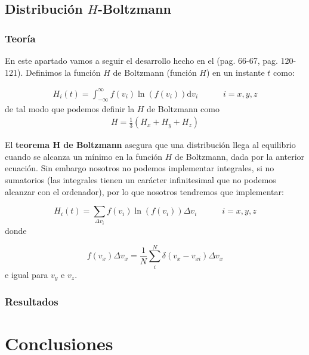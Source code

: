 \documentclass[11pt]{article} %
\newcommand{\parentesis}[1]{\left( #1  \right)}
\newcommand{\D}{\mathrm{d}}
\newcommand{\tquad}{\quad \quad \quad}
\begin{document}
	
\subsection{Distribución $H$-Boltzmann} 	
\subsubsection{Teoría}

En este apartado vamos a seguir el desarrollo hecho en el \cite{Haile} (pag. 66-67, pag. 120-121). Definimos la función $H$ de Boltzmann (función $H$) en un instante $t$ como:

\begin{eqnarray}
	H_i(t) = \int_{-\infty}^{\infty} f(v_i) \ln (f(v_i)) \D v_i \tquad i = x,y,z
\end{eqnarray} 
de tal modo que podemos definir la $H$ de Boltzmann como
\begin{eqnarray}
	H=\frac{1}{3} \parentesis{H_x+H_y+H_z}
\end{eqnarray}

El \textbf{teorema H de Boltzmann} asegura que una distribución llega al equilibrio cuando se alcanza un mínimo en la función $H$ de Boltzmann, dada por la anterior ecuación. Sin embargo nosotros no podemos implementar integrales, si no sumatorios (las integrales tienen un carácter infinitesimal que no podemos alcanzar con el ordenador), por lo que nosotros tendremos que implementar:

\begin{equation}
	H_i (t) = \sum_{\Delta v_i} f(v_i) \ln (f(v_i)) \Delta v_i  \tquad i=x,y,z
\end{equation}
donde

\begin{equation}
	f(v_x) \Delta v_x = \frac{1}{N} \sum_i^N \delta (v_x-v_{xi}) \Delta v_x
\end{equation}
e igual para $v_y$ e $v_z$. 


\subsubsection{Resultados}
	
\section{Conclusiones}
	
	


	
	
\end{document}

